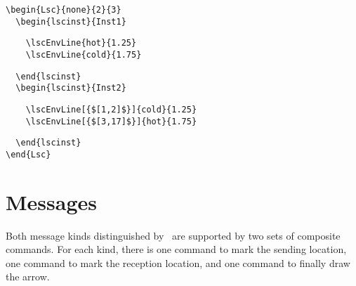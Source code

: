 \documentclass{article}
\begin{document}
\begin{center}%
\begin{minipage}{0.45\textwidth}%
\end{minipage}%
\hfill%
\begin{minipage}{0.48\textwidth}%
\small%
{\gray\begin{verbatim}
\begin{Lsc}{none}{2}{3}
  \begin{lscinst}{Inst1}
\end{verbatim}}%
\verbunskip%
\begin{verbatim}
    \lscEnvLine{hot}{1.25}
    \lscEnvLine{cold}{1.75}
\end{verbatim}
\verbunskip%
{\gray\begin{verbatim}
  \end{lscinst}
  \begin{lscinst}{Inst2}
\end{verbatim}}%
\verbunskip%
\begin{verbatim}
    \lscEnvLine[{$[1,2]$}]{cold}{1.25}
    \lscEnvLine[{$[3,17]$}]{hot}{1.75}
\end{verbatim}
\verbunskip%
{\gray\begin{verbatim}
  \end{lscinst}
\end{Lsc}
\end{verbatim}}%
\end{minipage}
\end{center}%

\section{Messages}
\label{sec:msg}

Both message kinds distinguished by~\cite{Klose2003} are supported by two sets
of composite commands.
%
For each kind, there is one command to mark the sending location, one command
to mark the reception location, and one command to finally draw the arrow.
\end{document}
